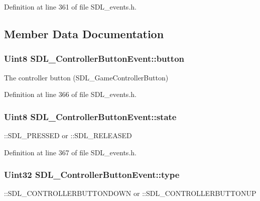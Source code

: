 Definition at line 361 of file S\+D\+L\+\_\+events.\+h.



\subsection{Member Data Documentation}
\hypertarget{structSDL__ControllerButtonEvent_a039da6cd31c3c62e62a3ae17cc64d0db}{
\subsubsection[{button}]{\setlength{\rightskip}{0pt plus 5cm}Uint8 S\+D\+L\+\_\+\+Controller\+Button\+Event\+::button}}\label{structSDL__ControllerButtonEvent_a039da6cd31c3c62e62a3ae17cc64d0db}
The controller button (S\+D\+L\+\_\+\+Game\+Controller\+Button) 

Definition at line 366 of file S\+D\+L\+\_\+events.\+h.

\hypertarget{structSDL__ControllerButtonEvent_a00c46683f86674c2a4f74404ee3e857c}{
\subsubsection[{state}]{\setlength{\rightskip}{0pt plus 5cm}Uint8 S\+D\+L\+\_\+\+Controller\+Button\+Event\+::state}}\label{structSDL__ControllerButtonEvent_a00c46683f86674c2a4f74404ee3e857c}
\+::\+S\+D\+L\+\_\+\+P\+R\+E\+S\+S\+E\+D or \+::\+S\+D\+L\+\_\+\+R\+E\+L\+E\+A\+S\+E\+D 

Definition at line 367 of file S\+D\+L\+\_\+events.\+h.

\hypertarget{structSDL__ControllerButtonEvent_a09869d792031e47a88673d85915c209f}{
\subsubsection[{type}]{\setlength{\rightskip}{0pt plus 5cm}Uint32 S\+D\+L\+\_\+\+Controller\+Button\+Event\+::type}}\label{structSDL__ControllerButtonEvent_a09869d792031e47a88673d85915c209f}
\+::\+S\+D\+L\+\_\+\+C\+O\+N\+T\+R\+O\+L\+L\+E\+R\+B\+U\+T\+T\+O\+N\+D\+O\+W\+N or \+::\+S\+D\+L\+\_\+\+C\+O\+N\+T\+R\+O\+L\+L\+E\+R\+B\+U\+T\+T\+O\+N\+U\+P 

